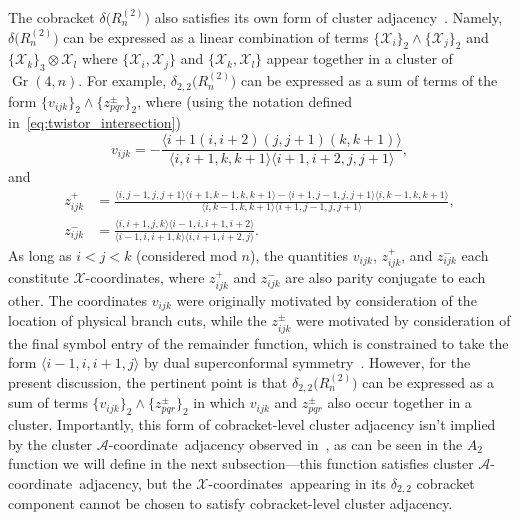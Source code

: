 \documentclass[11pt]{article}
\DeclareMathOperator{\Gr}{Gr}
\def\ket#1{\langle #1 \rangle}
\def\x{\mathcal{X}}
\def\xcoords{$\mathcal{X}$-coordinates}
\def\acoord{$\mathcal{A}$-coordinate}
\def\acoords{$\mathcal{A}$-coordinates}
\begin{document}

The cobracket $\delta\big(R^{(2)}_n\big)$ also satisfies its own form of cluster adjacency~\cite{Golden:2014pua}. Namely, $\delta\big(R^{(2)}_n\big)$ can be expressed as a linear combination of terms $\{\x_i\}_2 \wedge \{\x_j\}_2$ and $\{\x_k\}_3 \otimes \x_l$ where $\{\x_i,\x_j\}$ and $\{\x_k,\x_l\}$ appear together in a cluster of $\Gr(4,n)$. For example, $\delta_{2,2}\big(R^{(2)}_n\big)$ can be expressed as a sum of terms of the form $\{ v_{ijk} \}_2 \wedge \{ z^{\pm}_{pqr} \}_2$, where (using the notation defined in~\eqref{eq:twistor_intersection})
\begin{equation}
v_{ijk} = - \frac{\ket{i+1 (i,i+2) (j,j+1)(k,k+1)}}{\ket{i,i+1,k,k+1}\ket{i+1,i+2,j,j+1}},
\end{equation}
and
\begin{align}
z_{ijk}^+ &= \frac{\ket{i,j-1,j,j+1}\ket{i+1,k-1,k,k+1}-\ket{i+1,j-1,j,j+1}\ket{i,k-1,k,k+1}}{\ket{i,k-1,k,k+1}\ket{i+1,j-1,j,j+1}}, \nonumber \\
z_{ijk}^- &= \frac{\ket{i,i+1,j,k}\ket{i-1,i,i+1,i+2}}{\ket{i-1,i,i+1,k}\ket{i,i+1,i+2,j}}.
\end{align}
As long as $i<j<k$ (considered mod $n$), the quantities $v_{ijk}$, $z_{ijk}^+$, and $z_{ijk}^-$ each constitute \xcoords, where $z_{ijk}^+$ and $z_{ijk}^-$ are also parity conjugate to each other. The coordinates $v_{ijk}$ were originally motivated by consideration of the location of physical branch cuts, while the $z_{ijk}^\pm$ were motivated by consideration of the final symbol entry of the remainder function, which is constrained to take the form $\ket{i-1,i,i+1,j}$ by dual superconformal symmetry~\cite{CaronHuot:2011kk}. However, for the present discussion, the pertinent point is that $\delta_{2,2}\big(R^{(2)}_n\big)$ can be expressed as a sum of terms $\{ v_{ijk} \}_2 \wedge \{ z^{\pm}_{pqr} \}_2$ in which $v_{ijk}$ and $z^{\pm}_{pqr}$ also occur together in a cluster. Importantly, this form of cobracket-level cluster adjacency isn't implied by the cluster \acoord\ adjacency observed in~\cite{Drummond:2017ssj}, as can be seen in the $A_2$ function we will define in the next subsection---this function satisfies cluster \acoord\ adjacency, but the \xcoords\ appearing in its $\delta_{2,2}$ cobracket component cannot be chosen to satisfy cobracket-level cluster adjacency.
\end{document}
